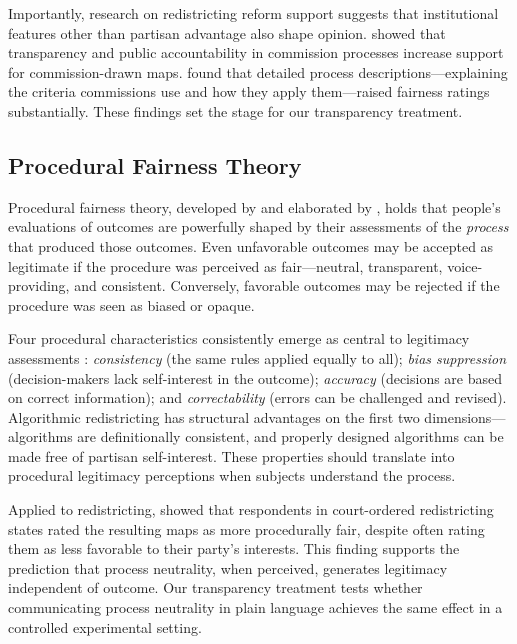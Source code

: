 Importantly, research on redistricting reform support suggests that institutional features other than partisan advantage also shape opinion. \citet{imig2022} showed that transparency and public accountability in commission processes increase support for commission-drawn maps. \citet{stephanopoulos2015} found that detailed process descriptions---explaining the criteria commissions use and how they apply them---raised fairness ratings substantially. These findings set the stage for our transparency treatment.

\subsection{Procedural Fairness Theory}

Procedural fairness theory, developed by \citet{thibaut1975procedural} and elaborated by \citet{tyler2006legitimacy,tyler1988authority}, holds that people's evaluations of outcomes are powerfully shaped by their assessments of the \textit{process} that produced those outcomes. Even unfavorable outcomes may be accepted as legitimate if the procedure was perceived as fair---neutral, transparent, voice-providing, and consistent. Conversely, favorable outcomes may be rejected if the procedure was seen as biased or opaque.

Four procedural characteristics consistently emerge as central to legitimacy assessments \citep{leventhal1980,lind1988social}: \textit{consistency} (the same rules applied equally to all); \textit{bias suppression} (decision-makers lack self-interest in the outcome); \textit{accuracy} (decisions are based on correct information); and \textit{correctability} (errors can be challenged and revised). Algorithmic redistricting has structural advantages on the first two dimensions---algorithms are definitionally consistent, and properly designed algorithms can be made free of partisan self-interest. These properties should translate into procedural legitimacy perceptions when subjects understand the process.

Applied to redistricting, \citet{gerber2018} showed that respondents in court-ordered redistricting states rated the resulting maps as more procedurally fair, despite often rating them as less favorable to their party's interests. This finding supports the prediction that process neutrality, when perceived, generates legitimacy independent of outcome. Our transparency treatment tests whether communicating process neutrality in plain language achieves the same effect in a controlled experimental setting.

